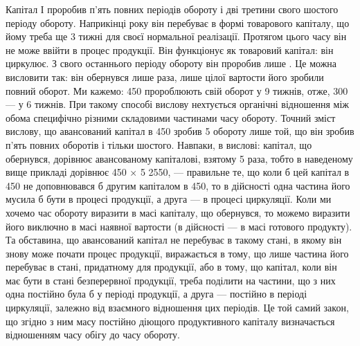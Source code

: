Капітал І проробив п’ять повних періодів обороту і дві третини свого
шостого періоду обороту. Наприкінці року він перебуває в формі товарового
капіталу, що йому треба ще 3 тижні для своєї нормальної реалізації.
Протягом цього часу він не може ввійти в процес продукції.
Він функціонує як товаровий капітал: він циркулює. З свого останнього
періоду обороту він проробив лише . Це можна висловити так: він
обернувся лише  раза, лише  цілої вартости його зробили повний оборот.
Ми кажемо: 450 пророблюють свій оборот у 9 тижнів, отже,
300 — у 6 тижнів. При такому способі вислову нехтується органічні
відношення між обома специфічно різними складовими частинами часу обороту.
Точний зміст вислову, що авансований капітал в 450 зробив
5 обороту лише той, що він зробив п’ять повних оборотів і тільки
 шостого. Навпаки, в вислові: капітал, що обернувся, дорівнює
авансованому капіталові, взятому 5 раза, тобто в наведеному вище прикладі
дорівнює 450 × 5 \deq{} 2550, — правильне те, що
коли б цей капітал в 450 не доповнювався б другим капіталом
в 450, то в дійсності одна частина його мусила б бути в процесі
продукції, а друга — в процесі циркуляції. Коли ми хочемо час обороту
виразити в масі капіталу, що обернувся, то можемо виразити його
виключно в масі наявної вартости (в дійсності — в масі готового продукту).
Та обставина, що авансований капітал не перебуває в такому
стані, в якому він знову може почати процес продукції, виражається в
тому, що лише частина його перебуває в стані, придатному для продукції,
або в тому, що капітал, коли він має бути в стані безперервної продукції,
треба поділити на частини, що з них одна постійно була б у періоді
продукції, а друга — постійно в періоді циркуляції, залежно від взаємного
відношення цих періодів. Це той самий закон, що згідно з ним
масу постійно діющого продуктивного капіталу визначається відношенням
часу обігу до часу обороту.

